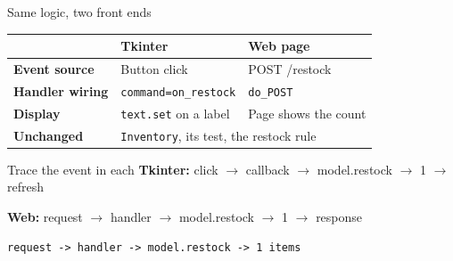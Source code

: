 \documentclass[aspectratio=169]{beamer}
\begin{document}
\begin{frame}{Same logic, two front ends}
\begin{center}
\begin{tabular}{@{}lll@{}}
\hline
 & \textbf{Tkinter} & \textbf{Web page} \\
\hline
\textbf{Event source} & Button click & POST /restock \\
\textbf{Handler wiring} & \texttt{command=on\_restock} & \texttt{do\_POST} \\
\textbf{Display} & \texttt{text.set} on a label & Page shows the count \\
\hline
\textbf{Unchanged} & \multicolumn{2}{l}{\texttt{Inventory}, its test, the restock rule} \\
\hline
\end{tabular}
\end{center}
\end{frame}

\begin{frame}[fragile]{Trace the event in each}
\codeframekicker
\textbf{Tkinter:} click $\rightarrow$ callback $\rightarrow$ model.restock $\rightarrow$ 1 $\rightarrow$ refresh

\vspace{2mm}
\textbf{Web:} request $\rightarrow$ handler $\rightarrow$ model.restock $\rightarrow$ 1 $\rightarrow$ response
\begin{lstlisting}
request -> handler -> model.restock -> 1 items
\end{lstlisting}
\end{frame}
\end{document}
